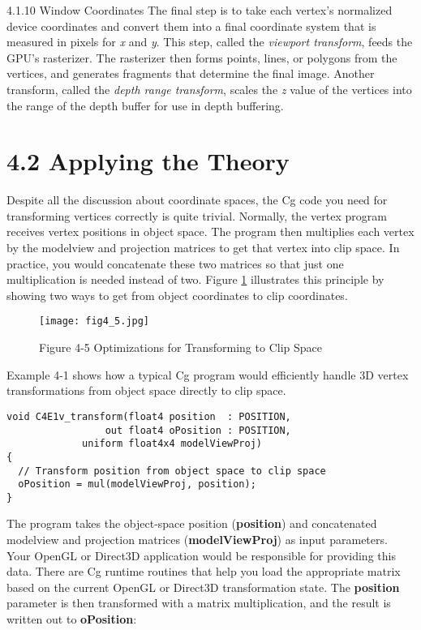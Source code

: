 \documentclass[../main.tex]{subfiles}
\begin{document}
4.1.10 Window Coordinates
The final step is to take each vertex's normalized device coordinates and convert them into a final coordinate system that is measured in pixels for \textit{x} and \textit{y}. This step, called the \textit{viewport transform}, feeds the GPU's rasterizer. The rasterizer then forms points, lines, or polygons from the vertices, and generates fragments that determine the final image. Another transform, called the \textit{depth range transform}, scales the \textit{z} value of the vertices into the range of the depth buffer for use in depth buffering.

\section{4.2 Applying the Theory}

Despite all the discussion about coordinate spaces, the Cg code you need for transforming vertices correctly is quite trivial. Normally, the vertex program receives vertex positions in object space. The program then multiplies each vertex by the modelview and projection matrices to get that vertex into clip space. In practice, you would concatenate these two matrices so that just one multiplication is needed instead of two. Figure \ref{fig:4-5} illustrates this principle by showing two ways to get from object coordinates to clip coordinates.

\begin{figure}
    \centering
    \texttt{[image: fig4\_5.jpg]}
    \caption{Figure 4-5 Optimizations for Transforming to Clip Space}
    \label{fig:4-5}
\end{figure}

Example 4-1 shows how a typical Cg program would efficiently handle 3D vertex transformations from object space directly to clip space.

\FloatBarrier
\begin{lstlisting}[caption=Example 4-1. The \textbf{C4E1v_transform} Vertex Program]
void C4E1v_transform(float4 position  : POSITION,
                 out float4 oPosition : POSITION,
             uniform float4x4 modelViewProj)
{
  // Transform position from object space to clip space
  oPosition = mul(modelViewProj, position);
}
\end{lstlisting}
\FloatBarrier

The program takes the object-space position (\textbf{position}) and concatenated modelview and projection matrices (\textbf{modelViewProj}) as input parameters. Your OpenGL or Direct3D application would be responsible for providing this data. There are Cg runtime routines that help you load the appropriate matrix based on the current OpenGL or Direct3D transformation state. The \textbf{position} parameter is then transformed with a matrix multiplication, and the result is written out to \textbf{oPosition}:
\end{document}
